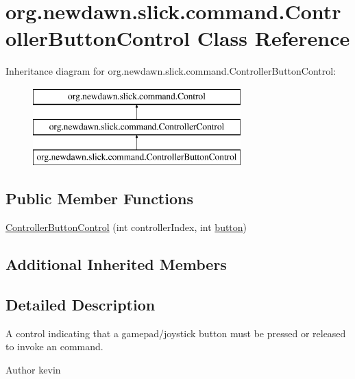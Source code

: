 \hypertarget{classorg_1_1newdawn_1_1slick_1_1command_1_1_controller_button_control}{}\section{org.\+newdawn.\+slick.\+command.\+Controller\+Button\+Control Class Reference}
\label{classorg_1_1newdawn_1_1slick_1_1command_1_1_controller_button_control}
Inheritance diagram for org.\+newdawn.\+slick.\+command.\+Controller\+Button\+Control\+:\begin{figure}[H]
\begin{center}
\leavevmode
\includegraphics[height=3.000000cm]{classorg_1_1newdawn_1_1slick_1_1command_1_1_controller_button_control}
\end{center}
\end{figure}
\subsection*{Public Member Functions}
\begin{DoxyCompactItemize}
\item 
\mbox{\hyperlink{classorg_1_1newdawn_1_1slick_1_1command_1_1_controller_button_control_aec92ab43b38eb977f61e2774a51f2e0e}{Controller\+Button\+Control}} (int controller\+Index, int \mbox{\hyperlink{classorg_1_1newdawn_1_1slick_1_1command_1_1_controller_control_ad8d48f8cc2889d5360de6dc2202203f4}{button}})
\end{DoxyCompactItemize}
\subsection*{Additional Inherited Members}


\subsection{Detailed Description}
A control indicating that a gamepad/joystick button must be pressed or released to invoke an command.

\begin{DoxyAuthor}{Author}
kevin 
\end{DoxyAuthor}


